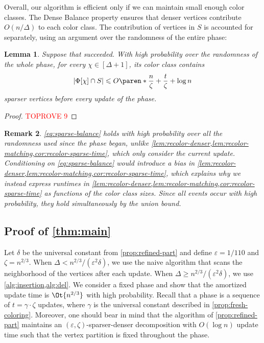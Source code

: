 \documentclass[a4paper,english,11pt]{amsart}
\newtheorem{lemma}{Lemma}[section]
\newtheorem{remark}[lemma]{Remark}
\theoremstyle{definition}
\renewcommand{\leq}{\leqslant}
\renewcommand{\geq}{\geqslant}
\DeclarePairedDelimiter{\paren}()
\newcommand{\eps}{\varepsilon}
\begin{document}
Overall, our algorithm is efficient only if we can maintain small enough color classes. The Dense Balance property ensures that denser vertices contribute $O(n/\Delta)$ to each color class. The contribution of vertices in $S$ is accounted for separately, using an argument over the randomness of the entire phase:
\begin{lemma}
    \label{lemma:dyn-sparse-balance}
    Suppose that \FreshColoring succeeded. With high probability \emph{over the randomness of the whole phase}, for every $\chi \in[\Delta+1]$, its color class contains
    \begin{equation}
        \label{eq:sparse-balance}
    | \Phi[\chi] \cap S |
    \leq O\paren*{ \frac{n}{\zeta} + \frac{t}{\zeta} + \log n }
    \end{equation}
    sparser vertices before every update of the phase.
\end{lemma}

\begin{proof}\textcolor{red}{TOPROVE 9}\end{proof}


\begin{remark}
    \cref{eq:sparse-balance} holds with high probability over all the randomness used since the phase began, unlike \cref{lem:recolor-denser,lem:recolor-matching,cor:recolor-sparse-time}, which only consider the current update. Conditioning on \cref{eq:sparse-balance} would introduce a bias in \cref{lem:recolor-denser,lem:recolor-matching,cor:recolor-sparse-time}, which explains why we instead express runtimes in \cref{lem:recolor-denser,lem:recolor-matching,cor:recolor-sparse-time} as functions of the color class sizes. Since all events occur with high probability, they hold simultaneously by the union bound.
\end{remark}




\subsection{Proof of \cref{thm:main}}
\label{sec:proof-theorem}

Let $\delta$ be the universal constant from \cref{prop:refined-part} and define $\eps = 1/110$ and $\zeta = n^{2/3}$.
When $\Delta < n^{2/3}/(\eps^2 \delta)$, we use the naive algorithm that scans the neighborhood of the vertices after each update. When $\Delta \geq n^{2/3}/(\eps^2\delta)$, we use \cref{alg:insertion,alg:del}. We consider a fixed phase and show that the amortized update time is $\Ot{ n^{2/3} }$ with high probability. Recall that a phase is a sequence of $t = \gamma \cdot \zeta$ updates, where $\gamma$ is the universal constant described in \cref{prop:fresh-coloring}. Moreover, one should bear in mind that the algorithm of \cref{prop:refined-part} maintains an $(\eps,\zeta)$-sparser-denser decomposition with $O(\log n)$ update time such that the vertex partition is fixed throughout the phase.
\end{document}
